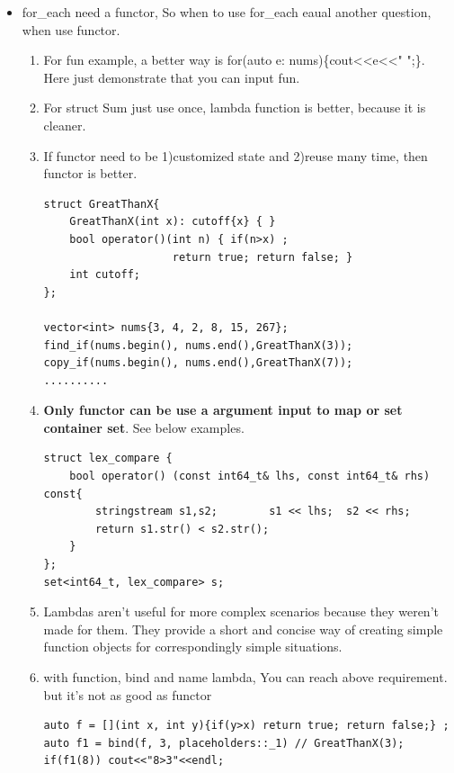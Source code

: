 \documentclass[a4paper,11pt,twoside]{book}
\begin{document}
\begin{itemize}
\item for\_each need a functor, So when to use for\_each eaual another question, when use functor.
\begin{enumerate}
\item For fun example, a better way is for(auto e: nums)\{cout<<e<<" ";\}. Here just demonstrate that  you can input fun.
\item For struct Sum just use once, lambda function is better, because it is cleaner.
\item If functor need to be 1)customized state and 2)reuse many time, then functor is better.
\begin{lstlisting}[numbers=none]
struct GreatThanX{
    GreatThanX(int x): cutoff{x} { } 
    bool operator()(int n) { if(n>x) ; 
                    return true; return false; }
    int cutoff;
};

vector<int> nums{3, 4, 2, 8, 15, 267};
find_if(nums.begin(), nums.end(),GreatThanX(3));
copy_if(nums.begin(), nums.end(),GreatThanX(7));
..........
\end{lstlisting}
\item \textbf{Only functor can be use a argument input to map or set container set}. See below examples.

\begin{lstlisting}[numbers=none]
struct lex_compare {
    bool operator() (const int64_t& lhs, const int64_t& rhs) const{
        stringstream s1,s2;        s1 << lhs;  s2 << rhs;
        return s1.str() < s2.str();
    }
};
set<int64_t, lex_compare> s;
\end{lstlisting}


\item Lambdas aren't useful for more complex scenarios because they weren't made for them. They provide a short and concise way of creating simple function objects for correspondingly simple situations.

\item with function, bind and name lambda, You can reach above requirement.  but it's not as good as functor
\begin{lstlisting}[numbers=none]
auto f = [](int x, int y){if(y>x) return true; return false;} ;
auto f1 = bind(f, 3, placeholders::_1) // GreatThanX(3);
if(f1(8)) cout<<"8>3"<<endl;
\end{lstlisting}

\end{enumerate}

\end{itemize}
\end{document}
